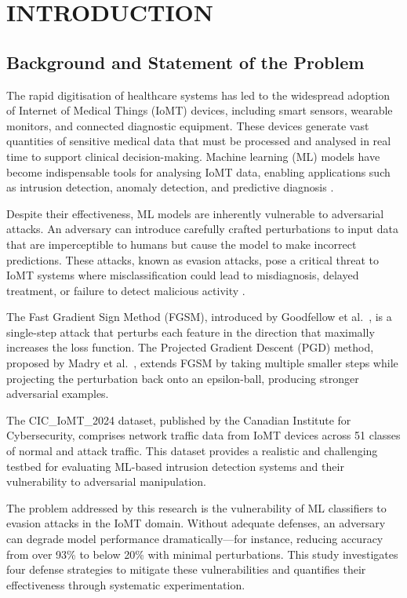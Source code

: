 \documentclass[12pt,a4paper,oneside]{report}
\begin{document}
\chapter{INTRODUCTION}

\section{Background and Statement of the Problem}

The rapid digitisation of healthcare systems has led to the widespread adoption of Internet of Medical Things (IoMT) devices, including smart sensors, wearable monitors, and connected diagnostic equipment. These devices generate vast quantities of sensitive medical data that must be processed and analysed in real time to support clinical decision-making. Machine learning (ML) models have become indispensable tools for analysing IoMT data, enabling applications such as intrusion detection, anomaly detection, and predictive diagnosis \cite{goodfellow2015explaining}.

Despite their effectiveness, ML models are inherently vulnerable to adversarial attacks. An adversary can introduce carefully crafted perturbations to input data that are imperceptible to humans but cause the model to make incorrect predictions. These attacks, known as evasion attacks, pose a critical threat to IoMT systems where misclassification could lead to misdiagnosis, delayed treatment, or failure to detect malicious activity \cite{madry2018towards, papernot2016limitations}.

The Fast Gradient Sign Method (FGSM), introduced by Goodfellow et al.~\cite{goodfellow2015explaining}, is a single-step attack that perturbs each feature in the direction that maximally increases the loss function. The Projected Gradient Descent (PGD) method, proposed by Madry et al.~\cite{madry2018towards}, extends FGSM by taking multiple smaller steps while projecting the perturbation back onto an epsilon-ball, producing stronger adversarial examples.

The CIC\_IoMT\_2024 dataset, published by the Canadian Institute for Cybersecurity, comprises network traffic data from IoMT devices across 51 classes of normal and attack traffic. This dataset provides a realistic and challenging testbed for evaluating ML-based intrusion detection systems and their vulnerability to adversarial manipulation.

The problem addressed by this research is the vulnerability of ML classifiers to evasion attacks in the IoMT domain. Without adequate defenses, an adversary can degrade model performance dramatically---for instance, reducing accuracy from over 93\% to below 20\% with minimal perturbations. This study investigates four defense strategies to mitigate these vulnerabilities and quantifies their effectiveness through systematic experimentation.
\end{document}

